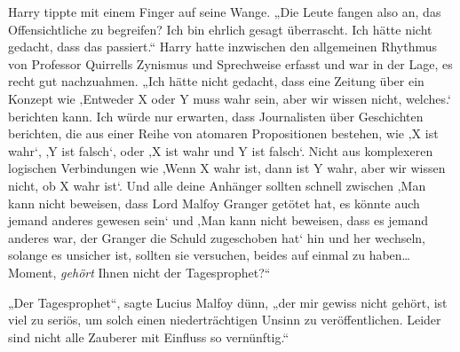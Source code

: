 Harry tippte mit einem Finger auf seine Wange.
„Die Leute fangen also an, das Offensichtliche zu begreifen? Ich bin ehrlich gesagt überrascht. Ich hätte nicht gedacht, dass das passiert.“
Harry hatte inzwischen den allgemeinen Rhythmus von Professor Quirrells Zynismus und Sprechweise erfasst und war in der Lage, es recht gut nachzuahmen.
„Ich hätte nicht gedacht, dass eine Zeitung über ein Konzept wie ‚Entweder X oder Y muss wahr sein, aber wir wissen nicht, welches.‘ berichten kann. Ich würde nur erwarten, dass Journalisten über Geschichten berichten, die aus einer Reihe von atomaren Propositionen bestehen, wie ‚X ist wahr‘, ‚Y ist falsch‘, oder ‚X ist wahr und Y ist falsch‘. Nicht aus komplexeren logischen Verbindungen wie ‚Wenn X wahr ist, dann ist Y wahr, aber wir wissen nicht, ob X wahr ist‘. Und alle deine Anhänger sollten schnell zwischen ‚Man kann nicht beweisen, dass Lord Malfoy Granger getötet hat, es könnte auch jemand anderes gewesen sein‘ und ‚Man kann nicht beweisen, dass es jemand anderes war, der Granger die Schuld zugeschoben hat‘ hin und her wechseln, solange es unsicher ist, sollten sie versuchen, beides auf einmal zu haben…Moment, \emph{gehört} Ihnen nicht der Tagesprophet?“

„Der Tagesprophet“, sagte Lucius Malfoy dünn, „der mir gewiss nicht gehört, ist viel zu seriös, um solch einen niederträchtigen Unsinn zu veröffentlichen. Leider sind nicht alle Zauberer mit Einfluss so vernünftig.“

